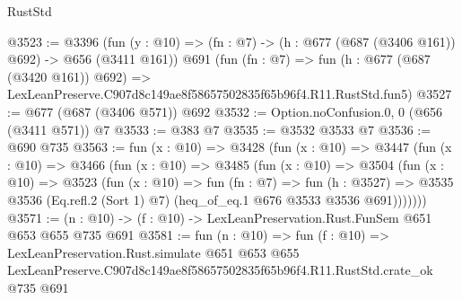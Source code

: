 \begin{lexlean}{RustStd}
\begin{coremodule}
@3523 := @3396
    (fun (y : @10) => (fn : @7) -> (h : @677 (@687 (@3406 @161)) @692) -> @656 (@3411 @161))
    @691
    (fun (fn : @7) =>
    fun (h : @677 (@687 (@3420 @161)) @692) =>
    LexLeanPreserve.C907d8c149ae8f58657502835f65b96f4.R11.RustStd.fun5)
@3527 := @677 (@687 (@3406 @571)) @692
@3532 := Option.noConfusion.{0, 0} (@656 (@3411 @571)) @7
@3533 := @383 @7
@3535 := @3532 @3533 @7
@3536 := @690 @735
@3563 := fun (x : @10) =>
  @3428
    (fun (x : @10) =>
    @3447
      (fun (x : @10) =>
      @3466
        (fun (x : @10) =>
        @3485
          (fun (x : @10) =>
          @3504
            (fun (x : @10) =>
            @3523
              (fun (x : @10) =>
              fun (fn : @7) =>
              fun (h : @3527) =>
              @3535 @3536 (Eq.refl.{2} (Sort 1) @7) (heq_of_eq.{1} @676 @3533 @3536 @691)))))))
@3571 := (n : @10) -> (f : @10) -> LexLeanPreservation.Rust.FunSem @651 @653 @655 @735 @691
@3581 := fun (n : @10) =>
  fun (f : @10) =>
  LexLeanPreservation.Rust.simulate
    @651
    @653
    @655
    LexLeanPreserve.C907d8c149ae8f58657502835f65b96f4.R11.RustStd.crate_ok
    @735
    @691
\end{coremodule}
\end{lexlean}
